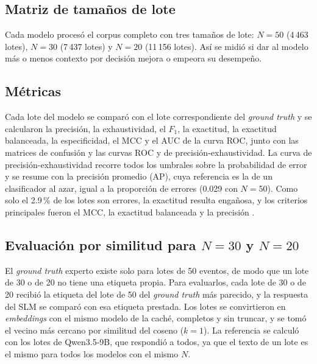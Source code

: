 \subsection{Matriz de tamaños de lote}

Cada modelo procesó el corpus completo con tres tamaños de lote: $N = 50$ (4\,463 lotes), $N = 30$ (7\,437 lotes) y $N = 20$ (11\,156 lotes). Así se midió si dar al modelo más o menos contexto por decisión mejora o empeora su desempeño.

\subsection{Métricas}\label{subsec:met_metricas}

Cada lote del modelo se comparó con el lote correspondiente del \textit{ground truth} y se calcularon la precisión, la exhaustividad, el $F_1$, la exactitud, la exactitud balanceada, la especificidad, el MCC y el AUC de la curva ROC, junto con las matrices de confusión y las curvas ROC y de precisión-exhaustividad. La curva de precisión-exhaustividad recorre todos los umbrales sobre la probabilidad de error y se resume con la precisión promedio (AP), cuya referencia es la de un clasificador al azar, igual a la proporción de errores (0.029 con $N = 50$). Como solo el 2.9\,\% de los lotes son errores, la exactitud resulta engañosa, y los criterios principales fueron el MCC, la exactitud balanceada y la precisión \cite{chicco2020_mcc}.


\subsection{Evaluación por similitud para $N = 30$ y $N = 20$}

El \textit{ground truth} experto existe solo para lotes de 50 eventos, de modo que un lote de 30 o de 20 no tiene una etiqueta propia. Para evaluarlos, cada lote de 30 o de 20 recibió la etiqueta del lote de 50 del \textit{ground truth} más parecido, y la respuesta del SLM se comparó con esa etiqueta prestada. Los lotes se convirtieron en \textit{embeddings} con el mismo modelo de la caché, completos y sin truncar, y se tomó el vecino más cercano por similitud del coseno ($k = 1$). La referencia se calculó con los lotes de Qwen3.5-9B, que respondió a todos, ya que el texto de un lote es el mismo para todos los modelos con el mismo $N$.

